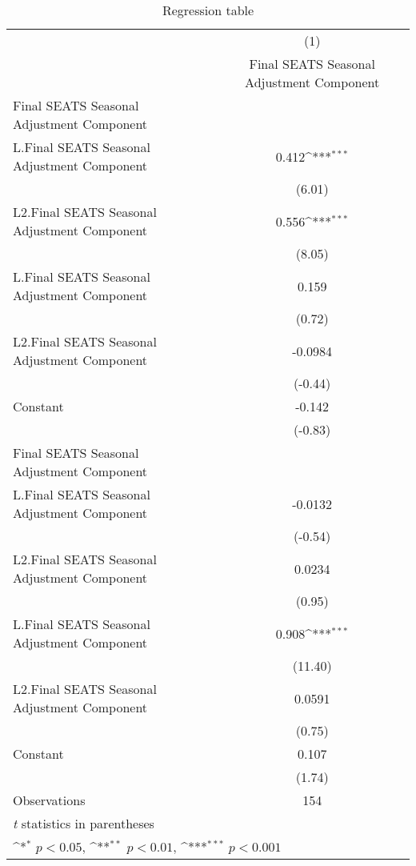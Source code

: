 \begin{table}[htbp]\centering
\def\sym#1{\ifmmode^{#1}\else\(^{#1}\)\fi}
\caption{Regression table\label{var\_x13}}
\begin{tabular}{l*{1}{c}}
\hline\hline
                    &\multicolumn{1}{c}{(1)}\\
                    &\multicolumn{1}{c}{Final SEATS Seasonal Adjustment Component}\\
\hline
Final SEATS Seasonal Adjustment Component&                     \\
L.Final SEATS Seasonal Adjustment Component&       0.412\sym{***}\\
                    &      (6.01)         \\
[1em]
L2.Final SEATS Seasonal Adjustment Component&       0.556\sym{***}\\
                    &      (8.05)         \\
[1em]
L.Final SEATS Seasonal Adjustment Component&       0.159         \\
                    &      (0.72)         \\
[1em]
L2.Final SEATS Seasonal Adjustment Component&     -0.0984         \\
                    &     (-0.44)         \\
[1em]
Constant            &      -0.142         \\
                    &     (-0.83)         \\
\hline
Final SEATS Seasonal Adjustment Component&                     \\
L.Final SEATS Seasonal Adjustment Component&     -0.0132         \\
                    &     (-0.54)         \\
[1em]
L2.Final SEATS Seasonal Adjustment Component&      0.0234         \\
                    &      (0.95)         \\
[1em]
L.Final SEATS Seasonal Adjustment Component&       0.908\sym{***}\\
                    &     (11.40)         \\
[1em]
L2.Final SEATS Seasonal Adjustment Component&      0.0591         \\
                    &      (0.75)         \\
[1em]
Constant            &       0.107         \\
                    &      (1.74)         \\
\hline
Observations        &         154         \\
\hline\hline
\multicolumn{2}{l}{\footnotesize \textit{t} statistics in parentheses}\\
\multicolumn{2}{l}{\footnotesize \sym{*} \(p<0.05\), \sym{**} \(p<0.01\), \sym{***} \(p<0.001\)}\\
\end{tabular}
\end{table}
